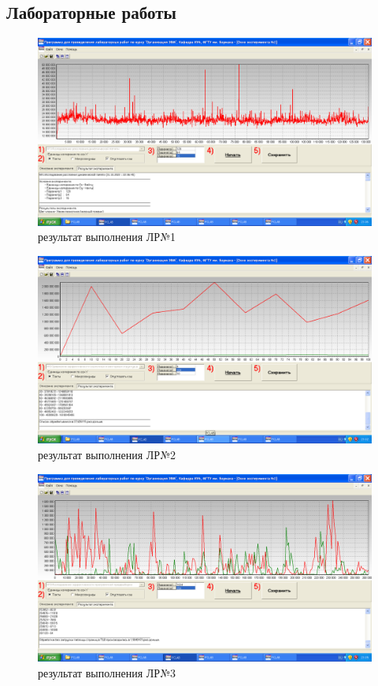 \subsection{Лабораторные работы}
\begin{figure}
	\centering
	\includegraphics[width=1\linewidth]{../images/screenshot003}
	\caption{результат выполнения ЛР№1}
	\label{fig:screenshot003}
\end{figure}
\begin{figure}
	\centering
	\includegraphics[width=1\linewidth]{../images/screenshot004}
	\caption{результат выполнения ЛР№2}
	\label{fig:screenshot004}
\end{figure}
\begin{figure}
	\centering
	\includegraphics[width=1\linewidth]{../images/screenshot005}
	\caption{результат выполнения ЛР№3}
	\label{fig:screenshot005}
\end{figure}
